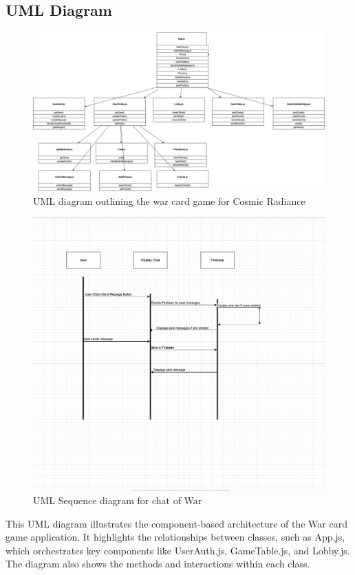 \subsection{UML Diagram}
\begin{figure}
    \centering
    \includegraphics[width=1\linewidth]{figures/finalUML.png}
    \caption{UML diagram outlining the war card game for Cosmic Radiance}
    \label{fig:enter-label}
\end{figure}

\begin{figure}
    \centering
    \includegraphics[width=1\linewidth]{figures/Sequence UML .png} %

    \caption{UML Sequence diagram for chat of War}
    \label{fig:enter-label}
\end{figure}

This UML diagram illustrates the component-based architecture of the War card game application. It highlights the relationships between classes, such as App.js, which orchestrates key components like UserAuth.js, GameTable.js, and Lobby.js. The diagram also shows the methods and interactions within each class.





